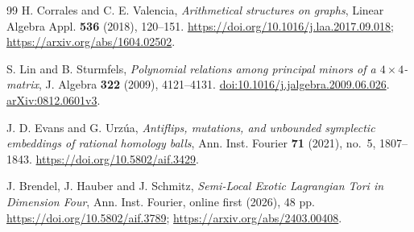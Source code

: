 \begin{thebibliography}{99}
H. Corrales and C. E. Valencia,
\emph{Arithmetical structures on graphs},
Linear Algebra Appl. \textbf{536} (2018), 120--151.
\url{https://doi.org/10.1016/j.laa.2017.09.018};
\url{https://arxiv.org/abs/1604.02502}.



S. Lin and B. Sturmfels,
\emph{Polynomial relations among principal minors of a $4\times4$-matrix},
J. Algebra \textbf{322} (2009), 4121--4131.
\href{https://doi.org/10.1016/j.jalgebra.2009.06.026}{doi:10.1016/j.jalgebra.2009.06.026}.
\href{https://arxiv.org/abs/0812.0601}{arXiv:0812.0601v3}.


J. D. Evans and G. Urz\'ua,
\emph{Antiflips, mutations, and unbounded symplectic embeddings of rational homology balls},
Ann. Inst. Fourier \textbf{71} (2021), no.~5, 1807--1843.
\url{https://doi.org/10.5802/aif.3429}.

J. Brendel, J. Hauber and J. Schmitz,
\emph{Semi-Local Exotic Lagrangian Tori in Dimension Four},
Ann. Inst. Fourier, online first (2026), 48 pp.
\url{https://doi.org/10.5802/aif.3789};
\url{https://arxiv.org/abs/2403.00408}.
\end{thebibliography}
